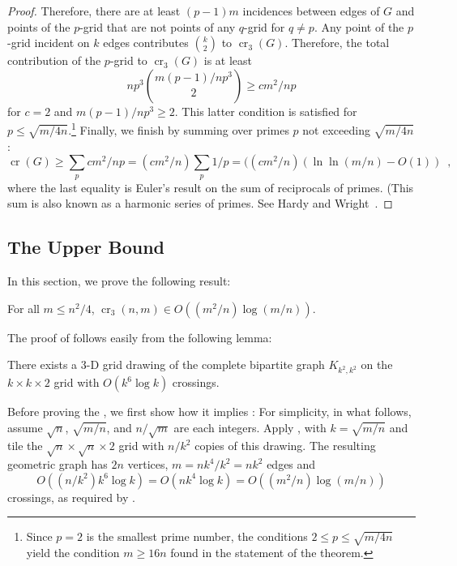 \documentclass{patmorin}
\DeclareMathOperator{\crs}{cr}
\begin{document}
\begin{proof}
  Therefore, there are at least $(p-1)m$ incidences between edges of $G$
  and points of the $p$-grid that are not points of any $q$-grid for
  $q\neq p$.  Any point of the $p$-grid incident on $k$ edges contributes
  $\binom{k}{2}$ to $\crs_3(G)$.  Therefore, the total contribution of
  the $p$-grid to $\crs_3(G)$ is at least
  \[
      np^3\binom{m(p-1)/np^3}{2} \ge cm^2/np
  \]
  for $c=2$ and $m(p-1)/np^3 \ge 2$.  This latter condition is satisfied
  for $p \le \sqrt{m/4n}$.\footnote{Since $p=2$ is the smallest prime
  number, the conditions $2\le p\le\sqrt{m/4n}$ yield the
  condition $m\ge 16n$ found in the statement of the theorem.} Finally,
  we finish by summing over primes $p$ not exceeding $\sqrt{m/4n}$:
  \[
     \crs(G) \ge \sum_{p} cm^2/np 
             = (cm^2/n) \sum_p 1/p 
             = ((cm^2/n)(\ln\ln(m/n)-O(1)) \enspace ,
  \]
  where the last equality is Euler's result on the sum of reciprocals
  of primes. (This sum is also known as a harmonic series of primes.
  See Hardy and Wright~\cite[Section~22.7]{hardy.wright:introduction}.
\end{proof}

\subsection{The Upper Bound}

In this section, we prove the following result:

\begin{thm}
  For all $m\le n^2/4$, $\crs_3(n,m) \in O((m^2/n)\log (m/n))$.
\end{thm}

The proof of  follows easily from the following
lemma:
\begin{lem}
  There exists a 3-D grid drawing of the complete bipartite graph
  $K_{k^2,k^2}$ on the $k\times k\times 2$ grid with $O(k^6\log k)$
  crossings.
\end{lem}

Before proving the , we first show how it implies
: For simplicity, in what follows, assume
$\sqrt{n}$, $\sqrt{m/n}$, and $n/\sqrt{m}$ are each integers.
Apply , with $k=\sqrt{m/n}$ and tile the
$\sqrt{n}\times\sqrt{n}\times 2$ grid with $n/k^2$ copies of
this drawing. The resulting geometric graph has $2n$ vertices,
$m=nk^4/k^2=nk^2$ edges and
\[ 
   O((n/k^2)k^6\log k) = O(nk^4\log k) = O((m^2/n)\log(m/n))
\] 
crossings, as required by .
\end{document}
